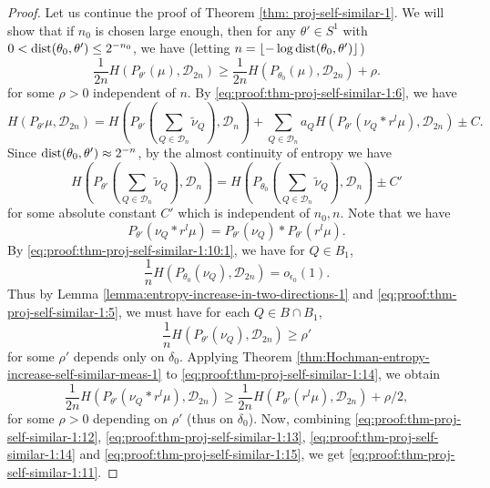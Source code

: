\documentclass[a4paper,11pt]{amsart}
\theoremstyle{definition}
\numberwithin{equation}{section}
\def\D{\mathcal{D}}
\DeclareMathOperator{\dist}{{\rm dist}}
\begin{document}
\begin{proof}
Let us continue the proof of Theorem \ref{thm: proj-self-similar-1}.  We will show  that if $n_0$ is chosen large enough, then for any $\theta'\in S^1$ with $0<\dist(\theta_0,\theta')\le 2^{-n_0}$, we have (letting $n=\lfloor-\log\dist(\theta_0,\theta')\rfloor$)
\begin{equation}\label{eq:proof:thm-proj-self-similar-1:11}
\frac{1}{2n}H(P_{\theta'}(\mu),\D_{2n})\ge \frac{1}{2n}H(P_{\theta_0}(\mu),\D_{2n})+\rho.
\end{equation}
for some $\rho>0$ independent of $n$.
By \eqref{eq:proof:thm-proj-self-similar-1:6}, we have 
\begin{equation}\label{eq:proof:thm-proj-self-similar-1:12}
H(P_{\theta'}\mu,\D_{2n} )=H(P_{\theta'}(\sum_{Q\in \D_n}\tilde{\nu}_Q),\D_n)+\sum_{Q\in \D_n}a_QH(P_{\theta'}(\nu_Q*r^l\mu),\D_{2n})\pm C.
\end{equation}
Since $\dist(\theta_0,\theta')\approx 2^{-n}$,  by the {\color{blue}almost continuity of entropy } we have
\begin{equation}\label{eq:proof:thm-proj-self-similar-1:13}
H(P_{\theta'}(\sum_{Q\in \D_n}\tilde{\nu}_Q),\D_n)=H(P_{\theta_0}(\sum_{Q\in \D_n}\tilde{\nu}_Q),\D_n)\pm C'
\end{equation}
for some absolute constant $C'$ which is independent of $n_0,n$. 
Note that we have
\begin{equation}\label{eq:proof:thm-proj-self-similar-1:14}
P_{\theta'}(\nu_Q*r^l\mu)=P_{\theta'}(\nu_Q)*P_{\theta'}(r^l\mu).
\end{equation}
By \eqref{eq:proof:thm-proj-self-similar-1:10:1}, we have for $Q\in B_1$,  
\[
\frac{1}{n}H(P_{\theta_0}(\nu_Q), \D_{2n})=o_{\epsilon_0}(1).
\]
Thus by Lemma \ref{lemma:entropy-increase-in-two-directions-1} and \eqref{eq:proof:thm-proj-self-similar-1:5}, we must have for each $Q\in B\cap B_1$,
\begin{equation}\label{eq:proof:thm-proj-self-similar-1:15}
\frac{1}{n}H(P_{\theta'}(\nu_Q), \D_{2n})\ge \rho'
\end{equation}
for some $\rho'$ depends only on $\delta_0$.  
Applying Theorem \ref{thm:Hochman-entropy-increase-self-similar-meas-1} to \eqref{eq:proof:thm-proj-self-similar-1:14}, we obtain 
\[
\frac{1}{2n}H(P_{\theta'}(\nu_Q*r^l\mu),\D_{2n}) \ge \frac{1}{2n}H(P_{\theta'}(r^l\mu),\D_{2n}) +\rho/2,
\]
for some $\rho>0$ depending on $\rho'$ (thus on $\delta_0$).
Now, combining \eqref{eq:proof:thm-proj-self-similar-1:12},  \eqref{eq:proof:thm-proj-self-similar-1:13}, \eqref{eq:proof:thm-proj-self-similar-1:14} and \eqref{eq:proof:thm-proj-self-similar-1:15}, we get 
\eqref{eq:proof:thm-proj-self-similar-1:11}. 


\end{proof}
\end{document}
